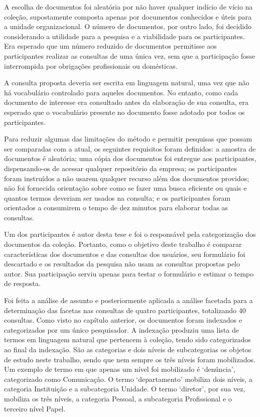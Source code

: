 A escolha de documentos foi aleatória por não haver qualquer indício de vício na coleção, supostamente composta apenas por documentos conhecidos e úteis para a unidade organizacional. O número de documentos, por outro lado, foi decidido considerando a utilidade para a pesquisa e a viabilidade para os participantes. Era esperado que um número reduzido de documentos permitisse aos participantes realizar as consultas de uma única vez, sem que a participação fosse interrompida por obrigações profissionais ou domésticas.

A consulta proposta deveria ser escrita em linguagem natural, uma vez que não há vocabulário controlado para aqueles documentos. No entanto, como cada documento de interesse era consultado antes da elaboração de sua consulta, era esperado que o vocabulário presente no documento fosse adotado por todos os participantes.

Para reduzir algumas das limitações do método e permitir pesquisas que possam ser comparadas com a atual, os seguintes requisitos foram definidos: a amostra de documentos é aleatória; uma cópia dos documentos foi entregue aos participantes, dispensando-os de acessar qualquer repositório da empresa; os participantes foram instruídos a não usarem qualquer recurso além dos documentos providos; não foi fornecida orientação sobre como se fazer uma busca eficiente ou quais e quantos termos deveriam ser usados na consulta; e os participantes foram orientados a consumirem o tempo de dez minutos para elaborar todas as consultas.

Um dos participantes é autor desta tese e foi o responsável pela categorização dos documentos da coleção. Portanto, como o objetivo deste trabalho é comparar características dos documentos e das consultas dos usuários, seu formulário foi descartado e os resultados da pesquisa não usam as consultas propostas pelo autor. Sua participação serviu apenas para testar o formulário e estimar o tempo de resposta.

Foi feita a análise de assunto e posteriormente aplicada a análise facetada para a determinação das facetas  nas consultas de quatro participantes, totalizando 40 consultas. Como visto no capítulo anterior, os documentos foram indexados e categorizados por um único pesquisador. A indexação produziu uma lista de termos em linguagem natural que pertencem à coleção, tendo sido categorizados ao final da indexação. São as categorias e dois níveis de subcategorias os objetos de estudo neste trabalho, sendo que nem sempre os três níveis foram mobilizados. Um exemplo de termo em que apenas um nível foi mobilizado é ‘denúncia’, categorizado como Comunicação. O termo ‘departamento’ mobiliza dois níveis, a categoria Instituição e a subcategoria Unidade. O termo ‘diretor’, por sua vez, mobiliza os três níveis, a categoria Pessoal, a subcategoria Profissional e o terceiro nível Papel.


